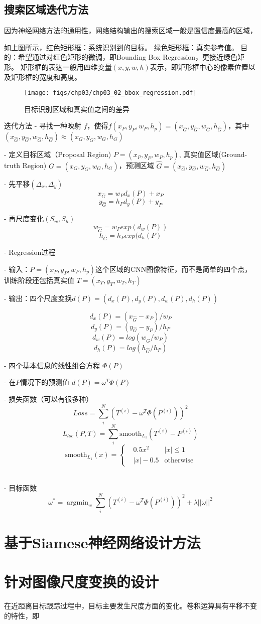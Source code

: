 \subsection{搜索区域迭代方法}
因为神经网络方法的通用性，网络结构输出的搜索区域一般是置信度最高的区域，

如上图所示，红色矩形框：系统识别到的目标。
绿色矩形框：真实参考值。
目的：希望通过对红色矩形的微调，即Bounding Box Regression，更接近绿色矩形。
矩形框的表达一般用四维变量$(x, y, w, h)$表示，即矩形框中心的像素位置以及矩形框的宽度和高度。

\begin{figure}[htb]   
	\centering
	\texttt{[image: figs/chp03/chp03\_02\_bbox\_regression.pdf]}
	\caption{目标识别区域和真实值之间的差异}
	\label{fig:chp03_02_bbox_regression}
\end{figure}


迭代方法
- 寻找一种映射 $f$，使得$f(x_P, y_P, w_P, h_p) = (x_{\hat{G}}, y_{\hat{G}}, w_{\hat{G}}, h_{\hat{G}})$，其中$(x_{\hat{G}}, y_{\hat{G}}, w_{\hat{G}}, h_{\hat{G}}) \approx (x_G, y_G, w_G, h_G)$

- 定义目标区域（Proposal Region) $P=(x_P, y_P, w_P, h_p)$, 真实值区域(Ground-truth Region) $G = (x_G, y_G, w_G, h_G)$，预测区域 $\hat{G}=(x_{\hat{G}}, y_{\hat{G}}, w_{\hat{G}}, h_{\hat{G}})$

- 先平移$(\Delta_x, \Delta_y)$
$$x_{\hat{G}} = w_{P}d_x(P)+x_P$$
$$y_{\hat{G}} = h_{P}d_y(P)+y_P$$

- 再尺度变化$(S_w, S_h)$
$$w_{\hat{G}}=w_{P}exp(d_w(P))$$
$$h_{\hat{G}}=h_{P}exp(d_h(P)$$

- Regression过程

- 输入：$P=(x_P, y_P, w_P, h_p)$这个区域的CNN图像特征，而不是简单的四个点，训练阶段还包括真实值 $T=(x_T, y_T, w_T, h_T)$

- 输出：四个尺度变换$d(P)=(d_x(P), d_y(P), d_w(P), d_h(P))$

$$d_x(P)=(x_{\hat{G}}-x_P)/w_P$$
$$d_y(P)=(y_{\hat{G}}-y_P)/h_P$$
$$d_w(P)=log(w_{\hat{G}}/w_P)$$
$$d_h(P)=log(h_{\hat{G}}/h_P)$$

- 四个基本信息的线性组合方程 $\Phi(P)$

- 在$P$情况下的预测值 $d(P)=\omega^T\Phi(P)$

- 损失函数（可以有很多种）
$$Loss=\sum^N_i(T^{(i)}-\omega^T\Phi(P^{(i)}))^2$$
$$L_{loc}(P,T) = \sum_{i}^N\text{smooth}_{L_1}(T^{(i)}-P^{(i)})$$
$$\text{smooth}_{L_1}(x) = \left \{ \begin{aligned} &0.5x^2 & |x| \le 1\\ &|x|-0.5 & \text{otherwise}\end{aligned} \right.$$
​

- 目标函数
$$\omega^*=\mathop{\arg\min}_{w}\sum^N_i(T^{(i)}-\omega^T\Phi(P^{(i)}))^2+\lambda||\omega||^2$$



\section{基于Siamese神经网络设计方法}

\section{针对图像尺度变换的设计}
在近距离目标跟踪过程中，目标主要发生尺度方面的变化。卷积运算具有平移不变的特性，即


 